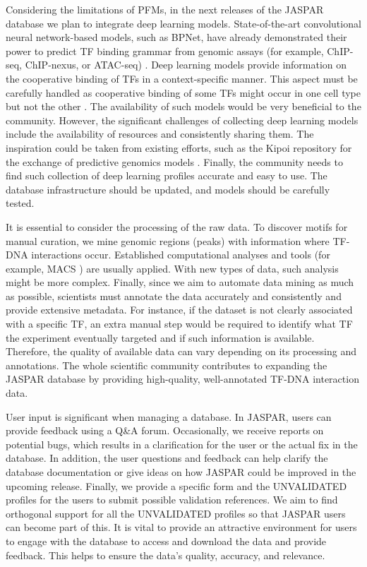     Considering the limitations of PFMs, in the next releases of the JASPAR database we plan to integrate deep learning models. State-of-the-art convolutional neural network-based models, such as BPNet, have already demonstrated their power to predict TF binding grammar from genomic assays (for example, ChIP-seq, ChIP-nexus, or ATAC-seq) \cite{avsec2021base}. Deep learning models provide information on the cooperative binding of TFs in a context-specific manner. This aspect must be carefully handled as cooperative binding of some TFs might occur in one cell type but not the other \cite{phuycharoen2020uncovering}. The availability of such models would be very beneficial to the community. However, the significant challenges of collecting deep learning models include the availability of resources and consistently sharing them. The inspiration could be taken from existing efforts, such as the Kipoi repository for the exchange of predictive genomics models \cite{avsec2019kipoi}. Finally, the community needs to find such collection of deep learning profiles accurate and easy to use. The database infrastructure should be updated, and models should be carefully tested.

    It is essential to consider the processing of the raw data. To discover motifs for manual curation, we mine genomic regions (peaks) with information where TF-DNA interactions occur. Established computational analyses and tools (for example, MACS \cite{zhang2008model} ) are usually applied. With new types of data, such analysis might be more complex. Finally, since we aim to automate data mining as much as possible, scientists must annotate the data accurately and consistently and provide extensive metadata. For instance, if the dataset is not clearly associated with a specific TF, an extra manual step would be required to identify what TF the experiment eventually targeted and if such information is available. Therefore, the quality of available data can vary depending on its processing and annotations. The whole scientific community contributes to expanding the JASPAR database by providing high-quality, well-annotated TF-DNA interaction data.

    User input is significant when managing a database. In JASPAR, users can provide feedback using a Q\&A forum. Occasionally, we receive reports on potential bugs, which results in a clarification for the user or the actual fix in the database. In addition, the user questions and feedback can help clarify the database documentation or give ideas on how JASPAR could be improved in the upcoming release. Finally, we provide a specific form and the UNVALIDATED profiles for the users to submit possible validation references. We aim to find orthogonal support for all the UNVALIDATED profiles so that JASPAR users can become part of this. It is vital to provide an attractive environment for users to engage with the database to access and download the data and provide feedback. This helps to ensure the data's quality, accuracy, and relevance.

